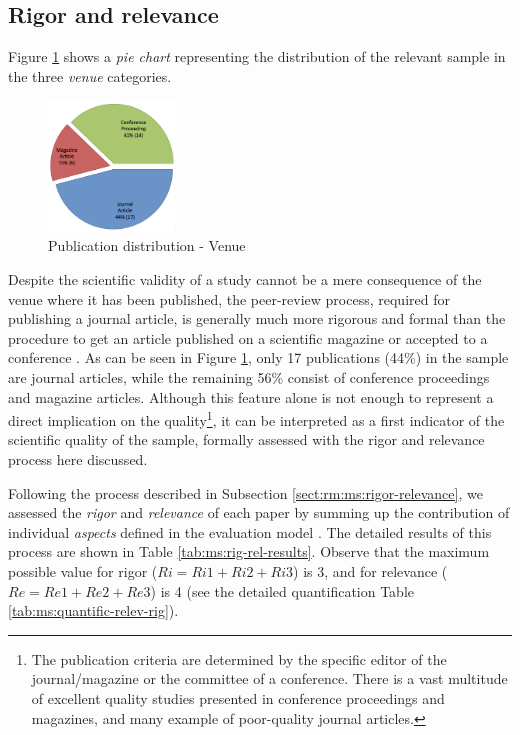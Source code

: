 \documentclass[final,5p,times,twocolumn]{elsarticle}
\begin{document}


\subsection{Rigor and relevance} %
\label{sub:rigor_and_relevance_results}

Figure \ref{fig:ms:venue}  shows a  \textit{pie chart} representing the distribution of the relevant sample in the three \textit{venue} categories.

 \begin{figure}[H]
\centering
\includegraphics[width=0.3\textwidth,keepaspectratio=true]{figures/venue.png}
\caption{Publication distribution - Venue}\label{fig:ms:venue}
\end{figure}

Despite the scientific validity of a study cannot be a mere consequence of the venue where it has been published, the peer-review process, required for publishing a journal article, is generally much more rigorous and formal than the procedure to get an article published on a scientific magazine or accepted to a conference \cite{ColinRobson2009}. As can be seen in Figure \ref{fig:ms:venue}, only 17 publications (44\%) in the sample are journal articles, while the remaining 56\% consist of conference proceedings and magazine articles. Although this feature alone is not enough to represent a direct implication on the quality\footnote{The publication criteria are determined by the specific editor of the journal/magazine or the committee of a conference. There is a vast multitude of excellent quality studies presented in conference proceedings and magazines, and many example of poor-quality journal articles.}, it can be interpreted as a first indicator of the scientific quality of the sample, formally assessed with the rigor and relevance process here discussed.
	
Following the process described in Subsection \ref{sect:rm:ms:rigor-relevance}, we assessed the \textit{rigor} and \textit{relevance} of each paper by summing up the contribution of individual  \textit{aspects} defined in the evaluation model \cite{Ivarsson2010}. The detailed results of this process are shown in Table \ref{tab:ms:rig-rel-results}. Observe that the maximum possible value for rigor ($Ri=Ri1+Ri2+Ri3$) is 3, and for relevance ($Re=Re1+Re2+Re3$) is 4 (see the detailed quantification Table \ref{tab:ms:quantific-relev-rig}).
\end{document}
